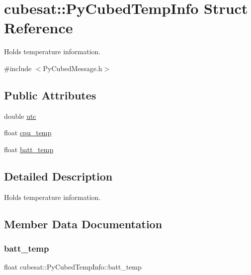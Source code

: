 \hypertarget{structcubesat_1_1PyCubedTempInfo}{}\section{cubesat\+:\+:Py\+Cubed\+Temp\+Info Struct Reference}
\label{structcubesat_1_1PyCubedTempInfo}


Holds temperature information.  




{\ttfamily \#include $<$Py\+Cubed\+Message.\+h$>$}

\subsection*{Public Attributes}
\begin{DoxyCompactItemize}
\item 
double \hyperlink{structcubesat_1_1PyCubedTempInfo_aa2e137388f0e71ddc9f8f528ec66dd20}{utc}
\item 
float \hyperlink{structcubesat_1_1PyCubedTempInfo_ae0773ca752df2cd590263f0a8d39e404}{cpu\+\_\+temp}
\item 
float \hyperlink{structcubesat_1_1PyCubedTempInfo_ae92b48f3a454931d8653e5b81904363a}{batt\+\_\+temp}
\end{DoxyCompactItemize}


\subsection{Detailed Description}
Holds temperature information. 

\subsection{Member Data Documentation}
\mbox{\label{structcubesat_1_1PyCubedTempInfo_ae92b48f3a454931d8653e5b81904363a}} 
\subsubsection{\texorpdfstring{batt\+\_\+temp}{batt\_temp}}
{\footnotesize\ttfamily float cubesat\+::\+Py\+Cubed\+Temp\+Info\+::batt\+\_\+temp}

